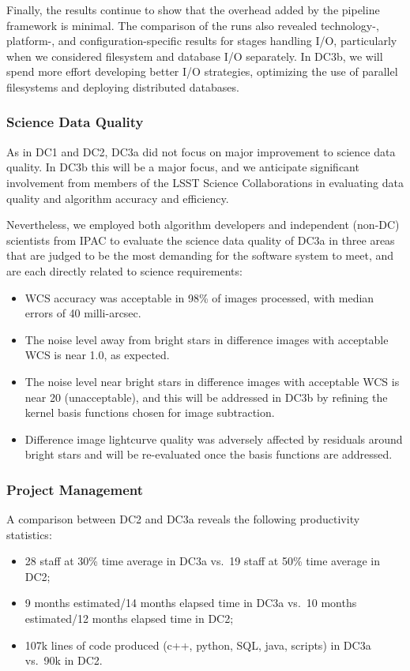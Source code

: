 Finally, the results continue to show that the overhead 
added by the  pipeline framework is minimal.
The comparison of the runs also revealed technology-, platform-, and configuration-specific results for stages
handling I/O, particularly when we considered filesystem and database
I/O separately. In DC3b, we will spend more effort developing better I/O
strategies, optimizing the use of parallel filesystems and deploying distributed databases.  

\subsubsection*{Science Data Quality}
As in DC1 and DC2, DC3a did not focus on major improvement to science data quality.  
In DC3b this will be a major focus, and we anticipate significant involvement from
members of the LSST Science Collaborations in evaluating data quality and algorithm accuracy
and efficiency.

Nevertheless, we employed both algorithm developers and independent
 (non-DC) scientists from IPAC
to evaluate the science data quality of DC3a in three areas that are
judged to be the most demanding for the software system to meet, 
and are each directly related to science requirements:
\begin{itemize}
\item WCS accuracy was acceptable in 98\% of images processed, with median errors of 40 milli-arcsec.
\item The noise level away from bright stars in difference images with acceptable WCS is near 1.0, as expected.
\item The noise level near bright stars in difference images with acceptable WCS is near 20 (unacceptable), and this will be addressed in DC3b by refining the kernel basis functions chosen for image subtraction.
\item Difference image lightcurve quality was adversely affected by residuals around bright stars and will be re-evaluated once the basis functions are addressed.
\end{itemize}

\subsubsection*{Project Management}
A comparison between DC2 and DC3a reveals the following productivity statistics:
\begin{itemize}
\item 28 staff at 30\% time average in DC3a vs.~19 staff at 50\% time average in DC2;
\item 9 months estimated/14 months elapsed time in DC3a vs.~10 months estimated/12 months elapsed time in DC2;
\item 107k lines of code produced (c++, python, SQL, java, scripts) in DC3a vs.~90k in DC2.
\end{itemize}

